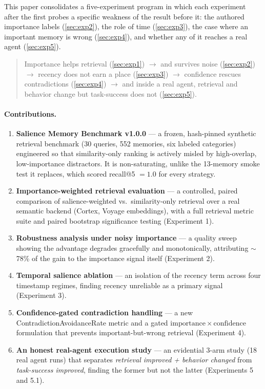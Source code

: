 \documentclass[11pt]{article}
\begin{document}
This paper consolidates a five-experiment program in which each experiment after the first
probes a specific weakness of the result before it: the authored importance labels
(\cref{sec:exp2}), the role of time (\cref{sec:exp3}), the case where an important memory
is wrong (\cref{sec:exp4}), and whether any of it reaches a real agent (\cref{sec:exp5}).

\begin{quote}
Importance helps retrieval (\cref{sec:exp1}) $\to$ and survives noise (\cref{sec:exp2})
$\to$ recency does not earn a place (\cref{sec:exp3}) $\to$ confidence rescues
contradictions (\cref{sec:exp4}) $\to$ and inside a real agent, retrieval and behavior
change but task-success does not (\cref{sec:exp5}).
\end{quote}

\paragraph{Contributions.}
\begin{enumerate}[leftmargin=1.4em,itemsep=2pt]
\item \textbf{Salience Memory Benchmark v1.0.0} --- a frozen, hash-pinned synthetic
retrieval benchmark (30 queries, 552 memories, six labeled categories) engineered so that
similarity-only ranking is actively misled by high-overlap, low-importance distractors. It
is non-saturating, unlike the 13-memory smoke test it replaces, which scored recall@5
$=1.0$ for every strategy.
\item \textbf{Importance-weighted retrieval evaluation} --- a controlled, paired comparison
of salience-weighted vs.\ similarity-only retrieval over a real semantic backend (Cortex,
Voyage embeddings), with a full retrieval metric suite and paired bootstrap significance
testing (Experiment 1).
\item \textbf{Robustness analysis under noisy importance} --- a quality sweep showing the
advantage degrades gracefully and monotonically, attributing $\sim$78\% of the gain to the
importance signal itself (Experiment 2).
\item \textbf{Temporal salience ablation} --- an isolation of the recency term across four
timestamp regimes, finding recency unreliable as a primary signal (Experiment 3).
\item \textbf{Confidence-gated contradiction handling} --- a new ContradictionAvoidanceRate
metric and a gated $\mathrm{importance}\times\mathrm{confidence}$ formulation that prevents
important-but-wrong retrieval (Experiment 4).
\item \textbf{An honest real-agent execution study} --- an evidential 3-arm study (18 real
agent runs) that separates \emph{retrieval improved + behavior changed} from
\emph{task-success improved}, finding the former but not the latter (Experiments 5 and 5.1).
\end{enumerate}
\end{document}
